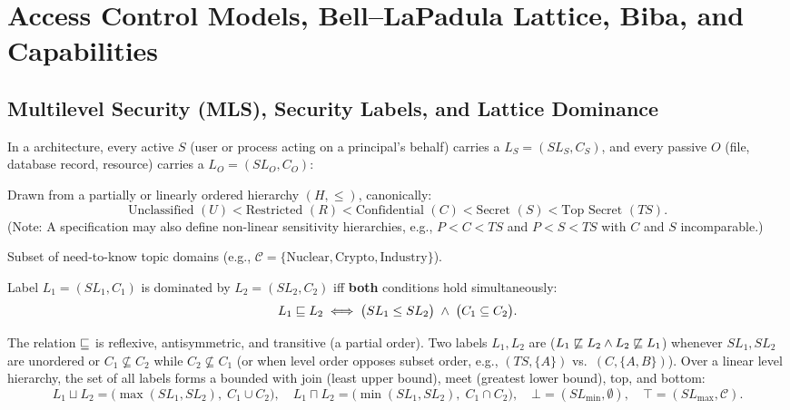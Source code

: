 \section{Access Control Models, Bell--LaPadula Lattice, Biba, and Capabilities}

\subsection{Multilevel Security (MLS), Security Labels, and Lattice Dominance}
In a  architecture, every active  $S$ (user or process acting on a principal's behalf) carries a  $L_S = (SL_S, C_S)$, and every passive  $O$ (file, database record, resource) carries a  $L_O = (SL_O, C_O)$:
\begin{compactitem}
  \item {} Drawn from a partially or linearly ordered hierarchy $(H, \le)$, canonically:
  \[
    \text{Unclassified } (U) < \text{Restricted } (R) < \text{Confidential } (C) < \text{Secret } (S) < \text{Top Secret } (TS).
  \]
  (Note: A specification may also define non-linear sensitivity hierarchies, e.g., $P < C < TS$ and $P < S < TS$ with $C$ and $S$ incomparable.)
  \item {} Subset of need-to-know topic domains (e.g., $\mathcal{C} = \{\text{Nuclear}, \text{Crypto}, \text{Industry}\}$).
  \item {} Label $L_1 = (SL_1, C_1)$ is dominated by $L_2 = (SL_2, C_2)$ iff \textbf{both} conditions hold simultaneously:
  \[
    L_1 \sqsubseteq L_2 \iff \big(SL_1 \le SL_2\big) \;\land\; \big(C_1 \subseteq C_2\big).
  \]
  \item {} The relation $\sqsubseteq$ is reflexive, antisymmetric, and transitive (a partial order). Two labels $L_1, L_2$ are  ($L_1 \not\sqsubseteq L_2 \land L_2 \not\sqsubseteq L_1$) whenever $SL_1, SL_2$ are unordered or $C_1 \not\subseteq C_2$ while $C_2 \not\subseteq C_1$ (or when level order opposes subset order, e.g., $(TS, \{A\})$ vs.\ $(C, \{A, B\})$). Over a linear level hierarchy, the set of all labels forms a bounded  with join (least upper bound), meet (greatest lower bound), top, and bottom:
  \[
    L_1 \sqcup L_2 = \big(\max(SL_1, SL_2),\; C_1 \cup C_2\big), \quad
    L_1 \sqcap L_2 = \big(\min(SL_1, SL_2),\; C_1 \cap C_2\big), \quad
    \bot = (SL_{\min}, \emptyset), \quad
    \top = (SL_{\max}, \mathcal{C}).
  \]
\end{compactitem}

